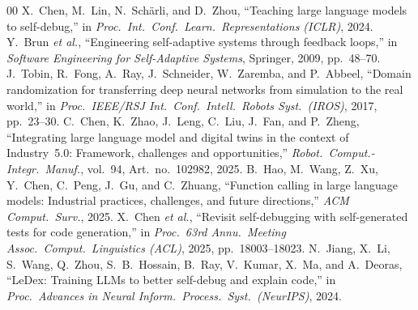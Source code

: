 \documentclass[conference]{IEEEtran}
\begin{document}
\begin{thebibliography}{00}
 X.~Chen, M.~Lin, N.~Sch\"arli, and D.~Zhou, ``Teaching large language models to self-debug,'' in \textit{Proc.\ Int.\ Conf.\ Learn.\ Representations (ICLR)}, 2024.
 Y.~Brun \textit{et al.}, ``Engineering self-adaptive systems through feedback loops,'' in \textit{Software Engineering for Self-Adaptive Systems}, Springer, 2009, pp.~48--70.
 J.~Tobin, R.~Fong, A.~Ray, J.~Schneider, W.~Zaremba, and P.~Abbeel, ``Domain randomization for transferring deep neural networks from simulation to the real world,'' in \textit{Proc.\ IEEE/RSJ Int.\ Conf.\ Intell.\ Robots Syst.\ (IROS)}, 2017, pp.~23--30.
 C.~Chen, K.~Zhao, J.~Leng, C.~Liu, J.~Fan, and P.~Zheng, ``Integrating large language model and digital twins in the context of Industry~5.0: Framework, challenges and opportunities,'' \textit{Robot.\ Comput.-Integr.\ Manuf.}, vol.~94, Art.~no.~102982, 2025.
 B.~Hao, M.~Wang, Z.~Xu, Y.~Chen, C.~Peng, J.~Gu, and C.~Zhuang, ``Function calling in large language models: Industrial practices, challenges, and future directions,'' \textit{ACM Comput.\ Surv.}, 2025.
 X.~Chen \textit{et al.}, ``Revisit self-debugging with self-generated tests for code generation,'' in \textit{Proc.\ 63rd Annu.\ Meeting Assoc.\ Comput.\ Linguistics (ACL)}, 2025, pp.~18003--18023.
 N.~Jiang, X.~Li, S.~Wang, Q.~Zhou, S.~B.~Hossain, B.~Ray, V.~Kumar, X.~Ma, and A.~Deoras, ``LeDex: Training LLMs to better self-debug and explain code,'' in \textit{Proc.\ Advances in Neural Inform.\ Process.\ Syst.\ (NeurIPS)}, 2024.
\end{thebibliography}
\end{document}
